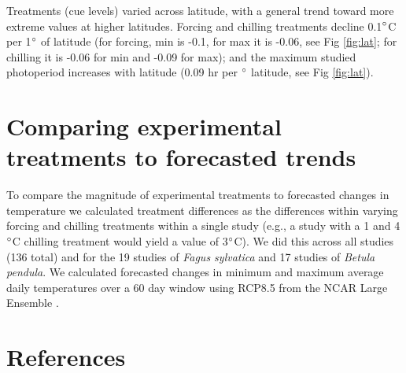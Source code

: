 \documentclass[11pt]{article}
\begin{document}
Treatments (cue levels) varied across latitude, with a general trend toward more extreme values at higher latitudes. Forcing and chilling treatments decline 0.1$\degree$C per 1$\degree$ of latitude (for forcing, min is -0.1, for max it is -0.06, see Fig \ref{fig:lat}; for chilling it is -0.06 for min and -0.09 for max); and the maximum studied photoperiod increases with latitude (0.09 hr per $\degree$ latitude, see Fig \ref{fig:lat}). 

\section{Comparing experimental treatments to forecasted trends}
To compare the magnitude of experimental treatments to forecasted changes in temperature we calculated treatment differences as the differences within varying forcing and chilling treatments within a single study (e.g., a study with a 1 and 4$\degree$C chilling treatment would yield a value of 3$\degree$C). We did this across all studies (136 total) and for the 19 studies of \emph{Fagus sylvatica} and 17 studies of \emph{Betula pendula}. We calculated forecasted changes in minimum and maximum average daily temperatures over a 60 day window using RCP8.5 from the NCAR Large Ensemble \citep[LENS, a multi-member ensemble of a single general circulation model, GCM, the Community Earth System Model][]{cesm2015}. 
\newpage
\section{References}


\newpage
\end{document}
